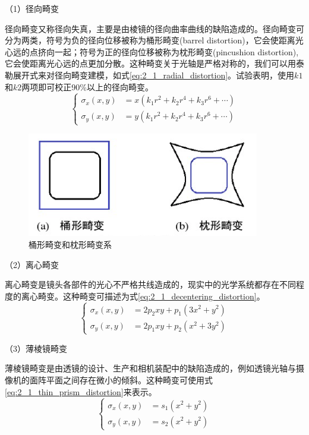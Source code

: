 （1）径向畸变

径向畸变又称径向失真，主要是由棱镜的径向曲率曲线的缺陷造成的。径向畸变可分为两类，符号为负的径向位移被称为桶形畸变(barrel distortion)，它会使距离光心远的点挤向一起；符号为正的径向位移被称为枕形畸变(pincushion distortion),它会使距离光心远的点更加分散。这种畸变关于光轴是严格对称的，我们可以用泰勒展开式来对径向畸变建模，如式\ref{eq:2_1_radial_distortion}。试验表明，使用$k1$和$k2$两项即可校正90\%以上的径向畸变\cite{hartley2003multiple}。
%
\begin{equation}\label{eq:2_1_radial_distortion}
\left\{
\begin{aligned}
\sigma_x(x,y) &= x(k_1 r^2 + k_2 r^4 + k_3 r^6 + \cdots)  \\
\sigma_y(x,y) &= y(k_1 r^2 + k_2 r^4 + k_3 r^6 + \cdots) 
\end{aligned}
\right.
\end{equation}

\begin{figure}[!htb] %
	\centering
	\includegraphics[width=4in]{figures/2_1_radial_distortion}
	\caption{桶形畸变和枕形畸变系}\label{fig:2_1_radial_distortion}
\end{figure}

（2）离心畸变

离心畸变是镜头各部件的光心不严格共线造成的，现实中的光学系统都存在不同程度的离心畸变。这种畸变可描述为式\ref{eq:2_1_decentering_distortion}。
%
\begin{equation}\label{eq:2_1_decentering_distortion}
\left\{
\begin{aligned}
\sigma_x(x,y) &= 2p_2 xy + p_1 (3x^2 + y^2)  \\
\sigma_y(x,y) &= 2p_1 xy + p_2 (x^2+ 3y^2)
\end{aligned}
\right.
\end{equation}

（3）薄棱镜畸变

薄棱镜畸变是由透镜的设计、生产和相机装配中的缺陷造成的，例如透镜光轴与摄像机的面阵平面之间存在微小的倾斜。这种畸变可使用式\ref{eq:2_1_thin_prism_distortion}来表示。
%
\begin{equation}\label{eq:2_1_thin_prism_distortion}
\left\{
\begin{aligned}
\sigma_x(x,y) &= s_1 (x^2 + y^2) \\
\sigma_y(x,y) &= s_2 (x^2 + y^2)
\end{aligned}
\right.
\end{equation}

